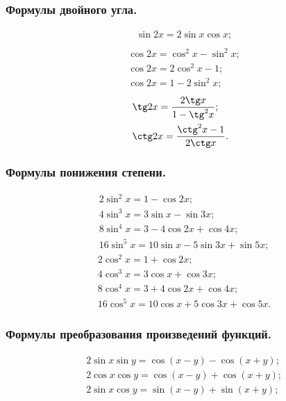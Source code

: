 \subsubsection{Формулы двойного угла.}
\vspace*{-1.8\baselineskip}
\begin{multicols}{3}
\begin{align*}
&\sin 2x = 2\sin x \cos x;\\ 
\end{align*}
\vfill
\columnbreak
\begin{align*}
&\cos 2x = \cos^2 x - \sin^2 x;\\
&\cos 2x = 2\cos^2 x - 1; \\
&\cos 2x = 1 - 2\sin^2 x;
\end{align*}
\vfill
\columnbreak
\begin{align*}
&\tg 2x = \frac{2\tg x}{1-\tg^2x};\\
&\ctg 2x = \frac{\ctg^2x-1}{2\ctg x}.
\end{align*}
\end{multicols}
\subsubsection{Формулы понижения степени.}
\vspace*{-1.8\baselineskip}
\begin{multicols}{2}
\begin{align*}
&2\sin^2x=1-\cos 2x;\\
&4\sin^3x=3\sin x-\sin 3x;\\
&8\sin^4x=3-4\cos2x+\cos4x;\\
&16\sin^5x=10\sin x-5\sin 3x +\sin 5x;
\end{align*}
\vfill
\columnbreak
\begin{align*}
&2\cos^2x=1+\cos 2x;\\
&4\cos^3x=3\cos x+\cos 3x;\\
&8\cos^4x=3+4\cos2x+\cos4x;\\
&16\cos^5x=10\cos x+5\cos 3x +\cos 5x.
\end{align*}
\end{multicols}
\subsubsection{Формулы преобразования произведений функций.}
\vspace*{-0.8\baselineskip}
\begin{align*}
&2\sin x \sin y = \cos (x-y)-\cos(x+y);\\
&2\cos x \cos y = \cos (x-y)+\cos(x+y);\\
&2\sin x \cos y = \sin (x-y)+\sin(x+y);
\end{align*}
\newpage
